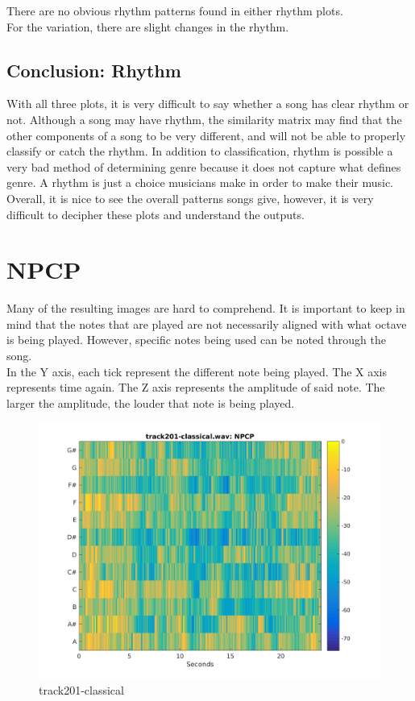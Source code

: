 \documentclass[11pt, a4paper]{article}
\begin{document}
There are no obvious rhythm patterns found in either rhythm plots. \\

For the variation, there are slight changes in the rhythm. 


\subsection{Conclusion: Rhythm}

With all three plots, it is very difficult to say whether a song has clear rhythm or not. Although a song may have rhythm, the similarity matrix may find that the other components of a song to be very different, and will not be able to properly classify or catch the rhythm. In addition to classification, rhythm is possible a very bad method of determining genre because it does not capture what defines genre. A rhythm is just a choice musicians make in order to make their music. \\

Overall, it is nice to see the overall patterns songs give, however, it is very difficult to decipher these plots and understand the outputs. 


\section{NPCP}





Many of the resulting images are hard to comprehend. It is important to keep in mind that the notes that are played are not necessarily aligned with what octave is being played. However, specific notes being used can be noted through the song. \\

In the Y axis, each tick represent the different note being played. The X axis represents time again. The Z axis represents the amplitude of said note. The larger the amplitude, the louder that note is being played. \\

\begin{figure}[H]
    \centering
    \includegraphics[width=.8\textwidth]{track201-classical-NPCP.png}
    \caption{track201-classical}
\end{figure}
\end{document}
